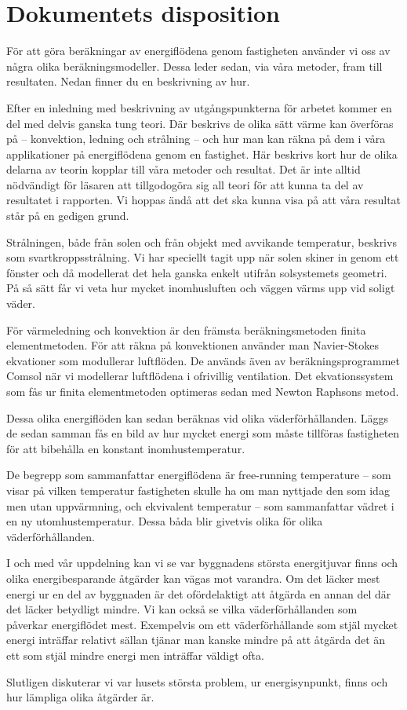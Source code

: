 \section{Dokumentets disposition}

För att göra beräkningar av energiflödena genom fastigheten använder vi oss av några olika beräkningsmodeller. Dessa leder sedan, via våra metoder, fram till resultaten. Nedan finner du en beskrivning av hur.

Efter en inledning med beskrivning av utgångspunkterna för arbetet kommer en del med
 delvis ganska tung teori. Där beskrivs de olika sätt värme kan överföras på – konvektion,
  ledning och strålning – och hur man kan räkna på dem i våra applikationer på 
  energiflödena genom en fastighet. Här beskrivs kort hur de olika delarna av teorin 
  kopplar till våra metoder och resultat. Det är inte alltid nödvändigt för läsaren att 
  tillgodogöra sig all teori för att kunna ta del av resultatet i rapporten. Vi hoppas ändå att 
  det ska kunna visa på att våra resultat står på en gedigen grund.

Strålningen, både från solen och från objekt med avvikande temperatur, beskrivs som 
svartkroppsstrålning. Vi har speciellt tagit upp när solen skiner in genom ett fönster och då 
modellerat det hela ganska enkelt utifrån solsystemets geometri. På så sätt får vi veta hur 
mycket inomhusluften och väggen värms upp vid soligt väder.

För värmeledning och konvektion är den främsta beräkningsmetoden finita 
elementmetoden. För att räkna på konvektionen använder man Navier-Stokes ekvationer 
som modullerar luftflöden. De används även av beräkningsprogrammet Comsol när vi 
modellerar luftflödena i ofrivillig ventilation. Det ekvationssystem som fås ur finita
 elementmetoden optimeras sedan med Newton Raphsons metod.

Dessa olika energiflöden kan sedan beräknas vid olika väderförhållanden. Läggs de 
sedan samman fås en bild av hur mycket energi som måste tillföras fastigheten för att 
bibehålla en konstant inomhustemperatur.

De begrepp som sammanfattar energiflödena är free-running temperature – som visar på 
vilken temperatur fastigheten skulle ha om man nyttjade den som idag men utan 
uppvärmning, och ekvivalent temperatur – som sammanfattar vädret i en ny utomhustemperatur. Dessa båda blir givetvis olika för olika väderförhållanden.

I och med vår uppdelning kan vi se var byggnadens största energitjuvar finns och 
olika energibesparande åtgärder kan vägas mot varandra. Om det läcker mest energi ur
 en del av byggnaden är det ofördelaktigt att åtgärda en annan del där det läcker betydligt
  mindre. Vi kan också se vilka väderförhållanden som påverkar energiflödet mest. 
Exempelvis om ett väderförhållande som stjäl mycket energi inträffar relativt sällan tjänar
 man kanske mindre på att åtgärda det än ett som stjäl mindre energi men inträffar väldigt 
 ofta.

Slutligen diskuterar vi var husets största problem, ur energisynpunkt, finns och hur lämpliga olika åtgärder är.
